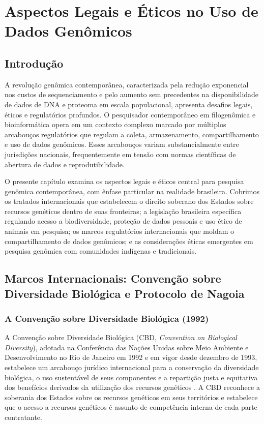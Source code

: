 
\chapter{Aspectos Legais e Éticos no Uso de Dados Genômicos}

\section{Introdução}

A revolução genômica contemporânea, caracterizada pela redução exponencial nos custos de sequenciamento e pelo aumento sem precedentes na disponibilidade de dados de DNA e proteoma em escala populacional, apresenta desafios legais, éticos e regulatórios profundos. O pesquisador contemporâneo em filogenômica e bioinformática opera em um contexto complexo marcado por múltiplos arcabouços regulatórios que regulam a coleta, armazenamento, compartilhamento e uso de dados genômicos. Esses arcabouços variam substancialmente entre jurisdições nacionais, frequentemente em tensão com normas científicas de abertura de dados e reprodutibilidade.

O presente capítulo examina os aspectos legais e éticos central para pesquisa genômica contemporânea, com ênfase particular na realidade brasileira. Cobrimos os tratados internacionais que estabelecem o direito soberano dos Estados sobre recursos genéticos dentro de suas fronteiras; a legislação brasileira específica regulando acesso a biodiversidade, proteção de dados pessoais e uso ético de animais em pesquisa; os marcos regulatórios internacionais que moldam o compartilhamento de dados genômicos; e as considerações éticas emergentes em pesquisa genômica com comunidades indígenas e tradicionais.

\section{Marcos Internacionais: Convenção sobre Diversidade Biológica e Protocolo de Nagoia}

\subsection{A Convenção sobre Diversidade Biológica (1992)}

A Convenção sobre Diversidade Biológica (CBD, \textit{Convention on Biological Diversity}), adotada na Conferência das Nações Unidas sobre Meio Ambiente e Desenvolvimento no Rio de Janeiro em 1992 e em vigor desde dezembro de 1993, estabelece um arcabouço jurídico internacional para a conservação da diversidade biológica, o uso sustentável de seus componentes e a repartição justa e equitativa dos benefícios derivados da utilização dos recursos genéticos \parencite{cbd1992}. A CBD reconhece a soberania dos Estados sobre os recursos genéticos em seus territórios e estabelece que o acesso a recursos genéticos é assunto de competência interna de cada parte contratante.

